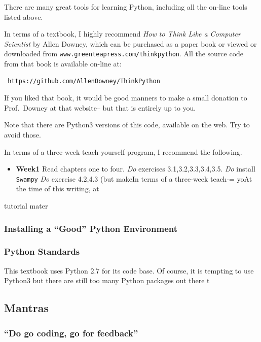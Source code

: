 There are many great tools for learning Python, including all the
on-line tools listed above.

In terms of a textbook, I highly recommend \emph{How to Think Like a
Computer Scientist} by Allen Downey, which can be purchased as a paper
book or viewed or downloaded from
\texttt{www.greenteapress.com/thinkpython}. All the source code from
that book is available on-line at:

\begin{lstlisting}
 https://github.com/AllenDowney/ThinkPython
\end{lstlisting}

If you liked that book, it would be good manners to make a small
donation to Prof.~Downey at that website-- but that is entirely up to
you.

Note that there are Python3 versions of this code, available on the web.
Try to avoid those.

In terms of a three week teach yourself program, I recommend the
following.

\begin{itemize}
\itemsep1pt\parskip0pt
\item
  \textbf{Week1} Read chapters one to four. \emph{Do} exercises
  3.1,3.2,3.3,3.4,3.5. \emph{Do} install \texttt{Swampy} \emph{Do}
  exercise 4.2,4.3 (but makeIn terms of a three-week teach-= yoAt the
  time of this writing, at
\end{itemize}

tutorial mater

\subsubsection{Installing a ``Good'' Python
Environment}\label{installing-a-good-python-environment}

\subsubsection{Python Standards}\label{python-standards}

This textbook uses Python 2.7 for its code base. Of course, it is
tempting to use Python3 but there are still too many Python packages out
there t

\subsection{Mantras}\label{mantras}

\subsubsection{\texorpdfstring{``Do go coding, go for
feedback''}{Do go coding, go for feedback}}\label{do-go-coding-go-for-feedback}

